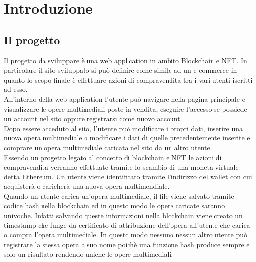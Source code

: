 \chapter{Introduzione}

\section{Il progetto}

Il progetto da sviluppare è una web application in ambito Blockchain e NFT. In particolare il sito sviluppato si può definire come simile ad un e-commerce in quanto lo scopo finale è effettuare azioni di compravendita tra i vari utenti iscritti ad esso.\\
All'interno della web application l'utente può navigare nella pagina principale e visualizzare le opere multimediali poste in vendita, eseguire l'accesso se possiede un account nel sito oppure registrarsi come nuovo account.\\
Dopo essere acceduto al sito, l'utente può modificare i propri dati, inserire una nuova opera multimediale o modificare i dati di quelle precedentemente inserite e comprare un'opera multimediale caricata nel sito da un altro utente.\\
Essendo un progetto legato al concetto di blockchain e NFT le azioni di compravendita verranno effettuate tramite lo scambio di una moneta virtuale detta Ethereum. Un utente viene identificato tramite l'indirizzo del wallet con cui acquisterà o caricherà una nuova opera multimendiale.\\
Quando un utente carica un'opera multimediale, il file viene salvato tramite codice hash nella blockchain ed in questo modo le opere caricate saranno univoche. Infatti salvando queste informazioni nella blockchain viene creato un timestamp che funge da certificato di attribuzione dell'opera all'utente che carica o compra l'opera multimediale. In questo modo nessuno nessun altro utente può registrare la stessa opera a suo nome poichè una funzione hash produce sempre e solo un risultato rendendo uniche le opere multimediali.\\